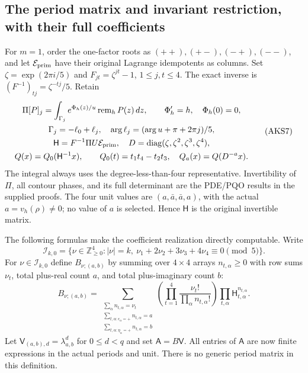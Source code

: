\documentclass[11pt,a4paper]{article}
\begin{document}
\subsection{The period matrix and invariant restriction, with their full coefficients}
For $m=1$, order the one-factor roots as $(++),(+-),(-+),(--)$, and let
$\mathcal E_{\rm prim}$ have their original Lagrange idempotents as columns.
Set $\zeta=\exp(2\pi i/5)$ and $F_{jt}=\zeta^{jt}-1$, $1\le j,t\le4$.
The exact inverse is $(F^{-1})_{tj}=\zeta^{-tj}/5$. Retain
\[
\begin{gathered}
 \Pi[P]_j=\int_{\Gamma_j}e^{\Phi_h(z)/u}\operatorname{rem}_hP(z)\,dz,
 \qquad\Phi_h'=h,\quad\Phi_h(0)=0,\\
 \Gamma_j=-\ell_0+\ell_j,\quad
 \arg\ell_j=(\arg u+\pi+2\pi j)/5,\\
 \mathsf H=F^{-1}\Pi U\mathcal E_{\rm prim},\quad
 D=\operatorname{diag}(\zeta,\zeta^2,\zeta^3,\zeta^4),\\
 Q(x)=Q_0(\mathsf H^{-1}x),\qquad
 Q_0(t)=t_1t_4-t_2t_3,\quad Q_a(x)=Q(D^{-a}x).
\end{gathered}\tag{AKS7}
\]
The integral always uses the degree-less-than-four representative.
Invertibility of $\Pi$, all contour phases, and its full determinant are
the PDE/PQO results in the supplied proofs. The four unit values are
$(a,\bar a,\bar a,a)$, with the actual $a=v_h(\rho)\ne0$; no value of $a$
is selected. Hence $\mathsf H$ is the original invertible matrix.

The following formulas make the coefficient realization directly
computable. Write
\[
 \mathcal I_{k,0}=\{\nu\in\mathbb Z_{\ge0}^4:|\nu|=k,
                         \ \nu_1+2\nu_2+3\nu_3+4\nu_4\equiv0\pmod5\}.
\]
For $\nu\in\mathcal I_{k,0}$ define $B_{\nu;(a,b)}$ by summing over
$4\times4$ arrays $n_{t,\alpha}\ge0$ with row sums $\nu_t$, total plus-real
count $a$, and total plus-imaginary count $b$:
\[
 B_{\nu;(a,b)}=
 \sum_{\substack{\sum_\alpha n_{t,\alpha}=\nu_t\\
       \sum_{t,\alpha:\epsilon_\alpha=+}n_{t,\alpha}=a\\
       \sum_{t,\alpha:\eta_\alpha=+}n_{t,\alpha}=b}}
 \left(\prod_{t=1}^4\frac{\nu_t!}{\prod_\alpha n_{t,\alpha}!}\right)
                  \prod_{t,\alpha}\mathsf H_{t,\alpha}^{n_{t,\alpha}}.
 \tag{AKS8}
\]
Let $\mathsf V_{(a,b),d}=\lambda_{a,b}^d$ for $0\le d<q$ and set
$\mathsf A=B\mathsf V$. All entries of $\mathsf A$ are now finite
expressions in the actual periods and unit. There is no generic period
matrix in this definition.
\end{document}
